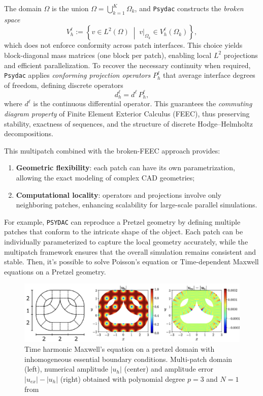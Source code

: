 \documentclass[a4paper,12pt,twoside]{report}
\begin{document}
The domain $\Omega$ is the union $\Omega = \bigcup_{k=1}^K \Omega_k$, and \texttt{Psydac} constructs the \emph{broken space}
\[
V_h^\ell := \left\{ v \in L^2(\Omega) \; \middle| \; v|_{\Omega_k} \in V_h^\ell(\Omega_k) \right\},
\]
which does not enforce conformity across patch interfaces. This choice yields block-diagonal mass matrices (one block per patch), enabling local $L^2$ projections and efficient parallelization. To recover the necessary continuity when required, \texttt{Psydac} applies \emph{conforming projection operators} $P_h^\ell$ that average interface degrees of freedom, defining discrete operators
\[
d_h^\ell = d^\ell \, P_h^\ell,
\]
where $d^\ell$ is the continuous differential operator. This guarantees the \emph{commuting diagram property} of Finite Element Exterior Calculus (FEEC), thus preserving stability, exactness of sequences, and the structure of discrete Hodge--Helmholtz decompositions.

This multipatch combined with the broken-FEEC approach provides:
\begin{enumerate}
	\item \textbf{Geometric flexibility}: each patch can have its own parametrization, allowing the exact modeling of complex CAD geometries;
	\item \textbf{Computational locality}: operators and projections involve only neighboring patches, enhancing scalability for large-scale parallel simulations.
\end{enumerate}

For example, \texttt{PSYDAC} can reproduce a Pretzel geometry by defining multiple patches that conform to the intricate shape of the object. Each patch can be individually parameterized to capture the local geometry accurately, while the multipatch framework ensures that the overall simulation remains consistent and stable. Then, it's possible to solve Poisson's equation or Time-dependent Maxwell equations on a Pretzel geometry.
\newpage
\begin{figure}[!h]
	\centering
	\includegraphics[width=1\textwidth]{figures/maxwell_pretzel.png}
	\caption{Time harmonic Maxwell's equation on a pretzel domain with inhomogeneous essential boundary conditions. Multi-patch domain (left), numerical amplitude $|u_h|$ (center) and amplitude error $|u_{ex}| - |u_h|$ (right) obtained with polynomial degree $p = 3$ and $N = 1$ from \cite{guclu_psydac_2022}}
\end{figure}
\end{document}
